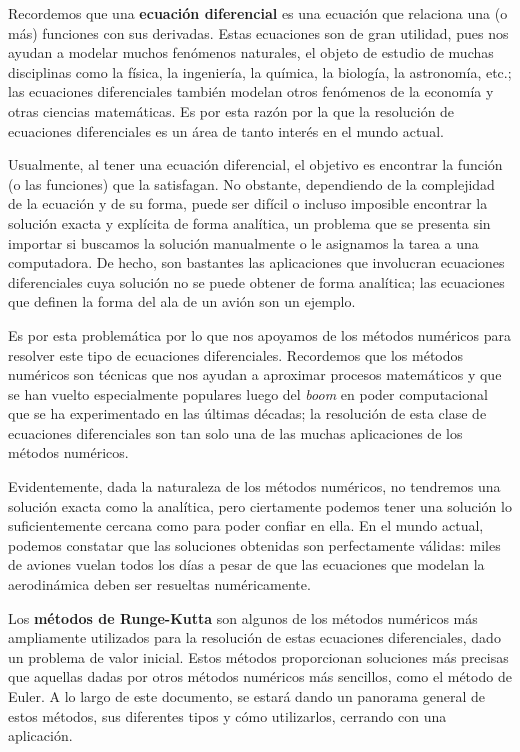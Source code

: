 Recordemos que una \textbf{ecuación diferencial} es una ecuación que relaciona una (o más) funciones con sus derivadas. Estas ecuaciones son de gran utilidad, pues nos ayudan a modelar muchos fenómenos naturales, el objeto de estudio de muchas disciplinas como la física, la ingeniería, la química, la biología, la astronomía, etc.; las ecuaciones diferenciales también modelan otros fenómenos de la economía y otras ciencias matemáticas. Es por esta razón por la que la resolución de ecuaciones diferenciales es un área de tanto interés en el mundo actual.

Usualmente, al tener una ecuación diferencial, el objetivo es encontrar la función (o las funciones) que la satisfagan. No obstante, dependiendo de la complejidad de la ecuación y de su forma, puede ser difícil o incluso imposible encontrar la solución exacta y explícita de forma analítica, un problema que se presenta sin importar si buscamos la solución manualmente o le asignamos la tarea a una computadora. De hecho, son bastantes las aplicaciones que involucran ecuaciones diferenciales cuya solución no se puede obtener de forma analítica; las ecuaciones que definen la forma del ala de un avión son un ejemplo.

Es por esta problemática por lo que nos apoyamos de los métodos numéricos para resolver este tipo de ecuaciones diferenciales. Recordemos que los métodos numéricos son técnicas que nos ayudan a aproximar procesos matemáticos y que se han vuelto especialmente populares luego del \textit{boom} en poder computacional que se ha experimentado en las últimas décadas; la resolución de esta clase de ecuaciones diferenciales son tan solo una de las muchas aplicaciones de los métodos numéricos.

Evidentemente, dada la naturaleza de los métodos numéricos, no tendremos una solución exacta como la analítica, pero ciertamente podemos tener una solución lo suficientemente cercana como para poder confiar en ella. En el mundo actual, podemos constatar que las soluciones obtenidas son perfectamente válidas: miles de aviones vuelan todos los días a pesar de que las ecuaciones que modelan la aerodinámica deben ser resueltas numéricamente.

Los \textbf{métodos de Runge-Kutta} son algunos de los métodos numéricos más ampliamente utilizados para la resolución de estas ecuaciones diferenciales, dado un problema de valor inicial. Estos métodos proporcionan soluciones más precisas que aquellas dadas por otros métodos numéricos más sencillos, como el método de Euler. A lo largo de este documento, se estará dando un panorama general de estos métodos, sus diferentes tipos y cómo utilizarlos, cerrando con una aplicación.
